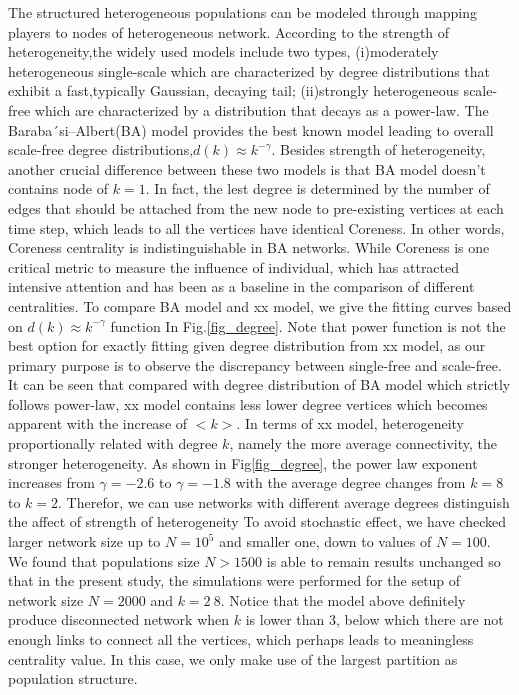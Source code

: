 \documentclass[preprint,12pt,3p]{elsarticle}
\begin{document}
\label{network model}
The structured heterogeneous populations can be modeled through mapping players to
nodes of heterogeneous network.
According to the strength of heterogeneity,the widely used models include two types,
(i)moderately heterogeneous single-scale which are characterized by degree distributions that exhibit a fast,typically Gaussian, decaying tail\cite{AmaralScala-18327};
(ii)strongly heterogeneous scale-free which are characterized by a distribution that decays as a power-law. The Baraba´si–Albert(BA) model provides the best known model leading to overall scale-free degree distributions,$d(k)\approx k^{-\gamma}$.
Besides strength of heterogeneity, another crucial difference between these two models is that BA model
doesn't contains node of $k=1$.
In fact, the lest degree is determined by the number of edges that should be attached from the new node to pre-existing vertices at each time step, which leads to all the vertices have identical Coreness.
In other words, Coreness centrality is indistinguishable in BA networks.
While Coreness is one critical metric to measure the influence of individual, which has attracted intensive attention and has been as a baseline in the comparison of different centralities\cite{LiuTang-17860,šikićLančić-17843,ZhaoHuang-17856}.
    To compare BA model and xx model, we give the fitting curves based on $d(k)\approx k^{-\gamma}$ function In Fig.\ref{fig_degree}.
Note that power function is not the best option for exactly fitting given degree distribution from xx model, as our primary purpose is to observe the discrepancy between single-free and scale-free.
It can be seen that compared with degree distribution of BA model which strictly follows power-law, xx model contains less lower degree vertices which becomes apparent with the increase of $<k>$.
In terms of xx model, heterogeneity proportionally related with degree $k$, namely the more average connectivity, the stronger heterogeneity. As shown in Fig\ref{fig_degree}, the power law exponent increases from  $\gamma=-2.6$ to $\gamma=-1.8$ with the average degree changes from $k=8$ to $k=2$.
Therefor, we can use networks with different average degrees distinguish the affect of strength of heterogeneity
To avoid stochastic effect, we have checked larger network size up to $N=10^5$ and smaller one,
down to values of $N=100$.
We found that populations size $N>1500$ is able to remain results unchanged so that in the present study,
the simulations were performed for the setup of network size $N=2000$ and $k=2~8$.
Notice that the model above definitely produce disconnected network when $k$ is lower than 3, below which there are not enough links to connect all the vertices, which perhaps leads to meaningless centrality value.
In this case, we only make use of the largest partition as population structure.
\end{document}
